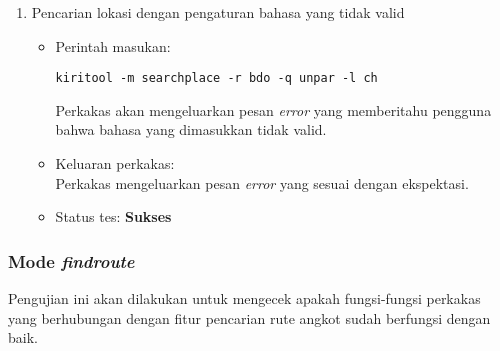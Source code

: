\begin{enumerate}
	\item Pencarian lokasi dengan pengaturan bahasa yang tidak valid
	\begin{itemize}
		\item Perintah masukan:
		\begin{verbatim}
kiritool -m searchplace -r bdo -q unpar -l ch
		\end{verbatim}
		Perkakas akan mengeluarkan pesan \textit{error} yang memberitahu pengguna bahwa bahasa yang dimasukkan tidak valid.
		\item Keluaran perkakas: \\
		Perkakas mengeluarkan pesan \textit{error} yang sesuai dengan ekspektasi.
		\item Status tes: \textbf{Sukses}
	\end{itemize}
	
\end{enumerate}

\subsubsection{Mode \textit{findroute}}
\label{sec:testing-experiments-findroute}

Pengujian ini akan dilakukan untuk mengecek apakah fungsi-fungsi perkakas yang berhubungan dengan fitur pencarian rute angkot sudah berfungsi dengan baik.

